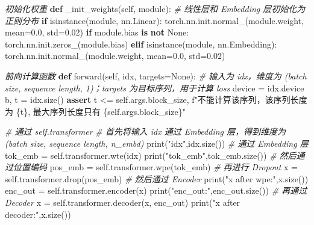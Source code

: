 \documentclass[
]{article}
\newenvironment{Shaded}{}{}
\newcommand{\BuiltInTok}[1]{\textcolor[rgb]{0.00,0.50,0.00}{#1}}
\newcommand{\CommentTok}[1]{\textcolor[rgb]{0.38,0.63,0.69}{\textit{#1}}}
\newcommand{\ControlFlowTok}[1]{\textcolor[rgb]{0.00,0.44,0.13}{\textbf{#1}}}
\newcommand{\FloatTok}[1]{\textcolor[rgb]{0.25,0.63,0.44}{#1}}
\newcommand{\KeywordTok}[1]{\textcolor[rgb]{0.00,0.44,0.13}{\textbf{#1}}}
\newcommand{\NormalTok}[1]{#1}
\newcommand{\OperatorTok}[1]{\textcolor[rgb]{0.40,0.40,0.40}{#1}}
\newcommand{\SpecialCharTok}[1]{\textcolor[rgb]{0.25,0.44,0.63}{#1}}
\newcommand{\SpecialStringTok}[1]{\textcolor[rgb]{0.73,0.40,0.53}{#1}}
\newcommand{\StringTok}[1]{\textcolor[rgb]{0.25,0.44,0.63}{#1}}
\newcommand{\VariableTok}[1]{\textcolor[rgb]{0.10,0.09,0.49}{#1}}
\begin{document}
\begin{Shaded}
\begin{Highlighting}[]
    \CommentTok{\textquotesingle{}\textquotesingle{}\textquotesingle{}初始化权重\textquotesingle{}\textquotesingle{}\textquotesingle{}}
    \KeywordTok{def}\NormalTok{ \_init\_weights(}\VariableTok{self}\NormalTok{, module):}
        \CommentTok{\# 线性层和 Embedding 层初始化为正则分布}
        \ControlFlowTok{if} \BuiltInTok{isinstance}\NormalTok{(module, nn.Linear):}
\NormalTok{            torch.nn.init.normal\_(module.weight, mean}\OperatorTok{=}\FloatTok{0.0}\NormalTok{, std}\OperatorTok{=}\FloatTok{0.02}\NormalTok{)}
            \ControlFlowTok{if}\NormalTok{ module.bias }\KeywordTok{is} \KeywordTok{not} \VariableTok{None}\NormalTok{:}
\NormalTok{                torch.nn.init.zeros\_(module.bias)}
        \ControlFlowTok{elif} \BuiltInTok{isinstance}\NormalTok{(module, nn.Embedding):}
\NormalTok{            torch.nn.init.normal\_(module.weight, mean}\OperatorTok{=}\FloatTok{0.0}\NormalTok{, std}\OperatorTok{=}\FloatTok{0.02}\NormalTok{)}
    
    \CommentTok{\textquotesingle{}\textquotesingle{}\textquotesingle{}前向计算函数\textquotesingle{}\textquotesingle{}\textquotesingle{}}
    \KeywordTok{def}\NormalTok{ forward(}\VariableTok{self}\NormalTok{, idx, targets}\OperatorTok{=}\VariableTok{None}\NormalTok{):}
        \CommentTok{\# 输入为 idx，维度为 (batch size, sequence length, 1)；targets 为目标序列，用于计算 loss}
\NormalTok{        device }\OperatorTok{=}\NormalTok{ idx.device}
\NormalTok{        b, t }\OperatorTok{=}\NormalTok{ idx.size()}
        \ControlFlowTok{assert}\NormalTok{ t }\OperatorTok{\textless{}=} \VariableTok{self}\NormalTok{.args.block\_size, }\SpecialStringTok{f"不能计算该序列，该序列长度为 }\SpecialCharTok{\{}\NormalTok{t}\SpecialCharTok{\}}\SpecialStringTok{, 最大序列长度只有 }\SpecialCharTok{\{}\VariableTok{self}\SpecialCharTok{.}\NormalTok{args}\SpecialCharTok{.}\NormalTok{block\_size}\SpecialCharTok{\}}\SpecialStringTok{"}

        \CommentTok{\# 通过 self.transformer}
        \CommentTok{\# 首先将输入 idx 通过 Embedding 层，得到维度为 (batch size, sequence length, n\_embd)}
        \BuiltInTok{print}\NormalTok{(}\StringTok{"idx"}\NormalTok{,idx.size())}
        \CommentTok{\# 通过 Embedding 层}
\NormalTok{        tok\_emb }\OperatorTok{=} \VariableTok{self}\NormalTok{.transformer.wte(idx)}
        \BuiltInTok{print}\NormalTok{(}\StringTok{"tok\_emb"}\NormalTok{,tok\_emb.size())}
        \CommentTok{\# 然后通过位置编码}
\NormalTok{        pos\_emb }\OperatorTok{=} \VariableTok{self}\NormalTok{.transformer.wpe(tok\_emb) }
        \CommentTok{\# 再进行 Dropout}
\NormalTok{        x }\OperatorTok{=} \VariableTok{self}\NormalTok{.transformer.drop(pos\_emb)}
        \CommentTok{\# 然后通过 Encoder}
        \BuiltInTok{print}\NormalTok{(}\StringTok{"x after wpe:"}\NormalTok{,x.size())}
\NormalTok{        enc\_out }\OperatorTok{=} \VariableTok{self}\NormalTok{.transformer.encoder(x)}
        \BuiltInTok{print}\NormalTok{(}\StringTok{"enc\_out:"}\NormalTok{,enc\_out.size())}
        \CommentTok{\# 再通过 Decoder}
\NormalTok{        x }\OperatorTok{=} \VariableTok{self}\NormalTok{.transformer.decoder(x, enc\_out)}
        \BuiltInTok{print}\NormalTok{(}\StringTok{"x after decoder:"}\NormalTok{,x.size())}


\end{Highlighting}
\end{Shaded}
\end{document}
